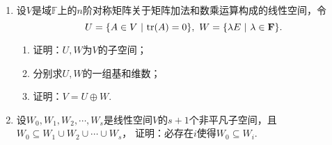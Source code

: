 \begin{enumerate}
    \item 设$V$是域$\mathbb{F}$上的$n$阶对称矩阵关于矩阵加法和数乘运算构成的线性空间，令
	\[U=\{A\in V\ |\ \textup{tr}(A)=0\},\ W=\{\lambda E\ |\ \lambda\in\mathbf{F}\}.\]
    \begin{enumerate}
        \item 证明：$U,W$为$V$的子空间；
        \item 分别求$U,W$的一组基和维数；
        \item 证明：$V=U\oplus W$.
    \end{enumerate}
	\item 设$W_0,W_1,W_2,\cdots,W_s$是线性空间$V$的$s+1$个非平凡子空间，且$W_0 \subseteq W_1 \cup W_2 \cup \cdots \cup W_s$，
	证明：必存在$i$使得$W_0\subseteq W_i$.
\end{enumerate}
